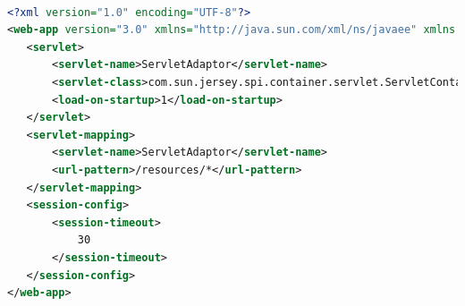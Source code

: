 \begin{lstlisting}[language=XML]

<?xml version="1.0" encoding="UTF-8"?>
<web-app version="3.0" xmlns="http://java.sun.com/xml/ns/javaee" xmlns:xsi="http://www.w3.org/2001/XMLSchema-instance" xsi:schemaLocation="http://java.sun.com/xml/ns/javaee http://java.sun.com/xml/ns/javaee/web-app\_3\_0.xsd">
   <servlet>
       <servlet-name>ServletAdaptor</servlet-name>
       <servlet-class>com.sun.jersey.spi.container.servlet.ServletContainer</servlet-class>
       <load-on-startup>1</load-on-startup>
   </servlet>
   <servlet-mapping>
       <servlet-name>ServletAdaptor</servlet-name>
       <url-pattern>/resources/*</url-pattern>
   </servlet-mapping>
   <session-config>
       <session-timeout>
           30
       </session-timeout>
   </session-config>
</web-app>
\end{lstlisting}




